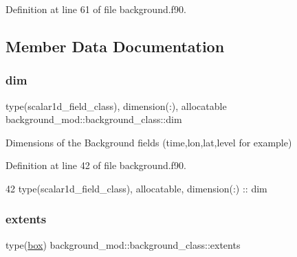 Definition at line 61 of file background.\+f90.



\subsection{Member Data Documentation}
\mbox{\label{structbackground__mod_1_1background__class_a086f319ce4f039190699578d69927013}} 
\subsubsection{\texorpdfstring{dim}{dim}}
{\footnotesize\ttfamily type(scalar1d\+\_\+field\+\_\+class), dimension(\+:), allocatable background\+\_\+mod\+::background\+\_\+class\+::dim\hspace{0.3cm}{\ttfamily [private]}}



Dimensions of the Background fields (time,lon,lat,level for example) 



Definition at line 42 of file background.\+f90.


\begin{DoxyCode}
42         \textcolor{keywordtype}{type}(scalar1d\_field\_class), \textcolor{keywordtype}{allocatable}, \textcolor{keywordtype}{dimension(:)} :: dim
\end{DoxyCode}
\mbox{\label{structbackground__mod_1_1background__class_acaaef54168dbee2731a99d0852844844}} 
\subsubsection{\texorpdfstring{extents}{extents}}
{\footnotesize\ttfamily type(\mbox{\hyperlink{structgeometry__mod_1_1box}{box}}) background\+\_\+mod\+::background\+\_\+class\+::extents\hspace{0.3cm}{\ttfamily [private]}}



